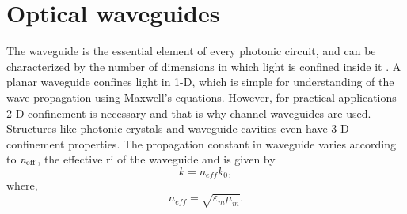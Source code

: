 \documentclass[../report.tex]{subfiles}
\begin{document}
		\section{Optical waveguides}
The waveguide is the essential element of every photonic circuit, and can be characterized by the number of dimensions in which light is confined inside it \cite{reed_silicon_2008}. A planar waveguide confines light in 1-D, which is simple for understanding of the wave propagation using Maxwell's equations. However, for practical applications 2-D confinement is necessary and that is why channel waveguides are used. Structures like photonic crystals and waveguide cavities even have 3-D confinement properties. The propagation constant in waveguide varies according to $\mathrm{\textit{n}_{eff}}$, the effective \gls{ri} of the waveguide and is given by 
\begin{equation}\label{eq:propagation_const_med_val}
k = n_{eff}k_0,
\end{equation}
where,
\begin{equation}\label{eq:ri_med_val}
n_{eff} = \sqrt {\varepsilon _{m}\mu _{m}}.
\end{equation}  			
\end{document}

